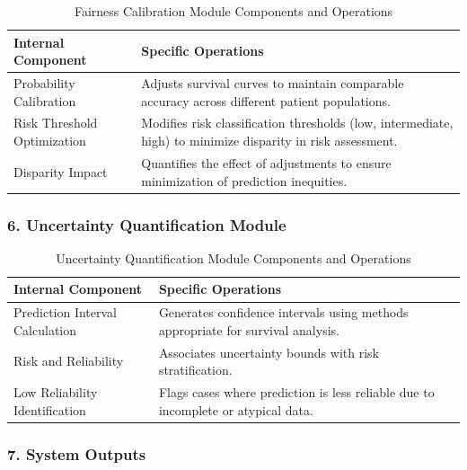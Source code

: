 \begin{table}[H]
\centering
\begin{tabular}{|p{5cm}|p{9cm}|}
\hline
\textbf{Internal Component} & \textbf{Specific Operations} \\
\hline
Probability Calibration & Adjusts survival curves to maintain comparable accuracy across different patient populations. \\
\hline
Risk Threshold Optimization & Modifies risk classification thresholds (low, intermediate, high) to minimize disparity in risk assessment. \\
\hline
Disparity Impact & Quantifies the effect of adjustments to ensure minimization of prediction inequities. \\
\hline
\end{tabular}
\caption{Fairness Calibration Module Components and Operations}
\label{tab:fairness_module}
\end{table}

\subsubsection{6. Uncertainty Quantification Module}

\begin{table}[H]
\centering
\begin{tabular}{|p{5cm}|p{9cm}|}
\hline
\textbf{Internal Component} & \textbf{Specific Operations} \\
\hline
Prediction Interval Calculation & Generates confidence intervals using methods appropriate for survival analysis. \\
\hline
Risk and Reliability & Associates uncertainty bounds with risk stratification. \\
\hline
Low Reliability Identification & Flags cases where prediction is less reliable due to incomplete or atypical data. \\
\hline
\end{tabular}
\caption{Uncertainty Quantification Module Components and Operations}
\label{tab:uncertainty_module}
\end{table}

\subsubsection{7. System Outputs}

